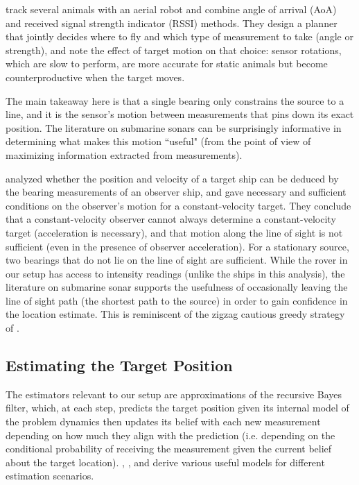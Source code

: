 \citet{chen2023conservationbots} track several animals with an aerial robot and combine angle of arrival (AoA) and received signal strength indicator (RSSI) methods. They design a planner that jointly decides where to fly and which type of measurement to take (angle or strength), and note the effect of target motion on that choice: sensor rotations, which are slow to perform, are more accurate for static animals but become
counterproductive when the target moves.

The main takeaway here is that a single bearing only constrains the source to a line, and it is the sensor's motion between
measurements that pins down its exact position. The literature on submarine sonars can be surprisingly informative in determining what makes this motion ``useful" (from the point of view of maximizing information extracted from measurements). 

\citet{lingren1978position} analyzed whether the position and velocity of a target ship can be deduced by the bearing measurements of an observer ship, and \citet{nardone1981observability} gave
necessary and sufficient conditions on the observer's motion for a constant-velocity target. They conclude that a constant-velocity observer cannot always determine a constant-velocity target (acceleration is necessary), and that motion along the line of sight is not sufficient (even in the presence of observer acceleration). For a stationary source, two bearings that do not lie on the line of sight are sufficient. 
While the rover in our setup has access to intensity readings (unlike the ships in this analysis), the literature on submarine sonar supports the usefulness of occasionally leaving the line of sight path (the shortest path to the source) in order to gain confidence in the location estimate. This is reminiscent of the zigzag cautious greedy strategy of \citet{vanderhook2014cautious}.


\subsection{Estimating the Target Position}

The estimators relevant to our setup are approximations of the recursive Bayes filter, which, at each step, predicts the target position given its internal model of the problem dynamics then updates its belief with each new measurement depending on how much they align with the prediction (i.e. depending on the conditional probability of receiving the measurement given the current belief about the target location). \citet{thrun2005probabilistic}, \citet{barshalom2001estimation}, and \citet{simon2006optimal} derive various useful models for different estimation scenarios.

